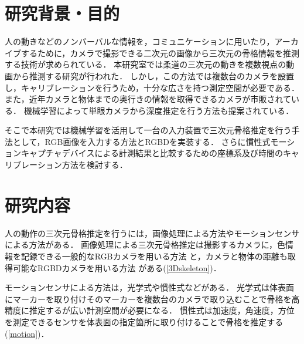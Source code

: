 \documentclass[titlepage]{jarticle}
\begin{document}
\maketitle

\section{研究背景・目的}
人の動きなどのノンバーバルな情報を，コミュニケーションに用いたり，アーカイブするために，カメラで撮影できる二次元の画像から三次元の骨格情報を推測する技術が求められている．
本研究室では柔道の三次元の動きを複数視点の動画から推測する研究\cite{turugi}が行われた．
しかし，この方法では複数台のカメラを設置し，キャリブレーションを行うため，十分な広さを持つ測定空間が必要である．
また，近年カメラと物体までの奥行きの情報を取得できるカメラが市販されている．
機械学習によって単眼カメラから深度推定を行う方法も提案されている\cite{depth}．

そこで本研究では機械学習を活用して一台の入力装置で三次元骨格推定を行う手法として，RGB画像を入力する方法とRGBDを実装する．
さらに慣性式モーションキャプチャデバイスによる計測結果と比較するための座標系及び時間のキャリブレーション方法を検討する．
\section{研究内容}
%
人の動作の三次元骨格推定を行うには，画像処理による方法やモーションセンサによる方法がある．%
画像処理による三次元骨格推定は撮影するカメラに，色情報を記録できる一般的なRGBカメラを用いる方法
と，カメラと物体の距離も取得可能なRGBDカメラを用いる方法
がある(\ref{3Dskeleton})．

モーションセンサによる方法は，光学式や慣性式などがある．
光学式は体表面にマーカーを取り付けそのマーカーを複数台のカメラで取り込むことで骨格を高精度に推定するが広い計測空間が必要になる．
慣性式は加速度，角速度，方位を測定できるセンサを体表面の指定箇所に取り付けることで骨格を推定する(\ref{motion})．

\end{document}
